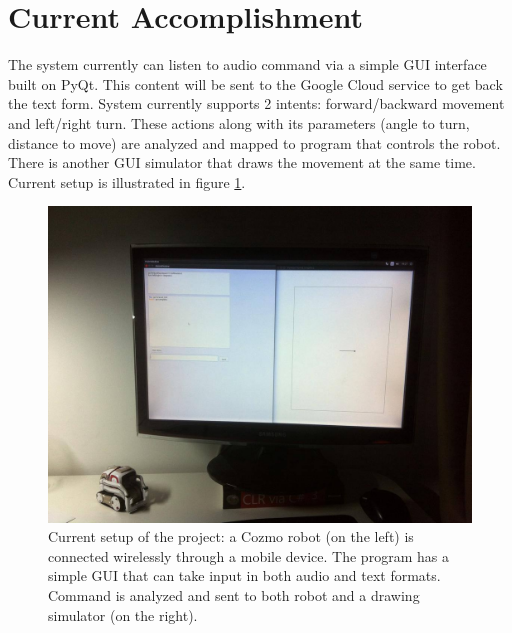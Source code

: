 \section{Current Accomplishment}
The system currently can listen to audio command via a simple GUI interface built on PyQt. This content will be sent to the Google Cloud service to get back the text form. System currently supports 2 intents: forward/backward movement and left/right turn. These actions along with its parameters (angle to turn, distance to move) are analyzed and mapped to program that controls the robot. There is another GUI simulator that draws the movement at the same time. Current setup is illustrated in figure \ref{fig:currentSetup}.
\begin{figure}[tb]
\centering
\includegraphics[width = 1.0\hsize]{./figures/currentSetup}
\caption{Current setup of the project: a Cozmo robot (on the left) is connected wirelessly through a mobile device. The program has a simple GUI that can take input in both audio and text formats. Command is analyzed and sent to both robot and a drawing simulator (on the right).}
\label{fig:currentSetup}
\end{figure}

